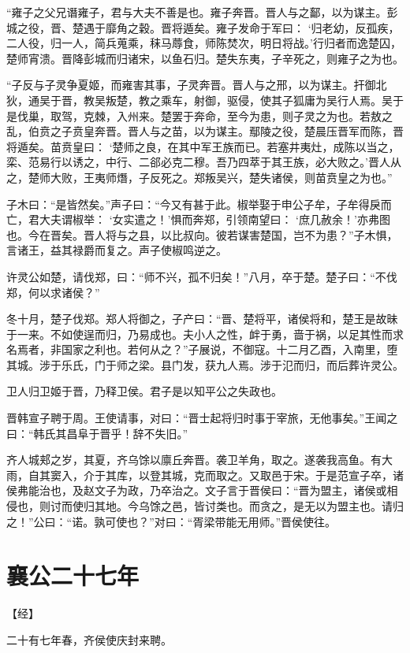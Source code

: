 \documentclass[a4paper,12pt,UTF8,twoside]{ctexbook}
\begin{document}
“雍子之父兄谮雍子，君与大夫不善是也。雍子奔晋。晋人与之鄐，以为谋主。彭城之役，晋、楚遇于靡角之穀。晋将遁矣。雍子发命于军曰： ‘归老幼，反孤疾，二人役，归一人，简兵蒐乘，秣马蓐食，师陈焚次，明日将战。’行归者而逸楚囚，楚师宵溃。晋降彭城而归诸宋，以鱼石归。楚失东夷，子辛死之，则雍子之为也。

“子反与子灵争夏姬，而雍害其事，子灵奔晋。晋人与之邢，以为谋主。扞御北狄，通吴于晋，教吴叛楚，教之乘车，射御，驱侵，使其子狐庸为吴行人焉。吴于是伐巢，取驾，克棘，入州来。楚罢于奔命，至今为患，则子灵之为也。若敖之乱，伯贲之子贲皇奔晋。晋人与之苗，以为谋主。鄢陵之役，楚晨压晋军而陈，晋将遁矣。苗贲皇曰： ‘楚师之良，在其中军王族而已。若塞井夷灶，成陈以当之，栾、范易行以诱之，中行、二郤必克二穆。吾乃四萃于其王族，必大败之。’晋人从之，楚师大败，王夷师熸，子反死之。郑叛吴兴，楚失诸侯，则苗贲皇之为也。”

子木曰：“是皆然矣。”声子曰：“今又有甚于此。椒举娶于申公子牟，子牟得戾而亡，君大夫谓椒举： ‘女实遣之！’惧而奔郑，引领南望曰： ‘庶几赦余！’亦弗图也。今在晋矣。晋人将与之县，以比叔向。彼若谋害楚国，岂不为患？”子木惧，言诸王，益其禄爵而复之。声子使椒鸣逆之。

许灵公如楚，请伐郑，曰：“师不兴，孤不归矣！”八月，卒于楚。楚子曰：“不伐郑，何以求诸侯？”

冬十月，楚子伐郑。郑人将御之，子产曰：“晋、楚将平，诸侯将和，楚王是故昧于一来。不如使逞而归，乃易成也。夫小人之性，衅于勇，啬于祸，以足其性而求名焉者，非国家之利也。若何从之？”子展说，不御寇。十二月乙酉，入南里，堕其城。涉于乐氏，门于师之梁。县门发，获九人焉。涉于氾而归，而后葬许灵公。

卫人归卫姬于晋，乃释卫侯。君子是以知平公之失政也。

晋韩宣子聘于周。王使请事，对曰：“晋士起将归时事于宰旅，无他事矣。”王闻之曰：“韩氏其昌阜于晋乎！辞不失旧。”

齐人城郏之岁，其夏，齐乌馀以廪丘奔晋。袭卫羊角，取之。遂袭我高鱼。有大雨，自其窦入，介于其库，以登其城，克而取之。又取邑于宋。于是范宣子卒，诸侯弗能治也，及赵文子为政，乃卒治之。文子言于晋侯曰：“晋为盟主，诸侯或相侵也，则讨而使归其地。今乌馀之邑，皆讨类也。而贪之，是无以为盟主也。请归之！”公曰：“诺。孰可使也？”对曰：“胥梁带能无用师。”晋侯使往。

\section{襄公二十七年}



【经】

二十有七年春，齐侯使庆封来聘。
\end{document}

